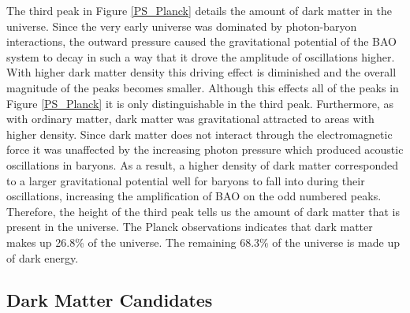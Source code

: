 \documentclass[a4paper,12pt]{article}
\begin{document}
The third peak in Figure \ref{PS_Planck} details the amount of dark matter in the universe.  Since the very early universe was dominated by photon-baryon interactions, the outward pressure caused the gravitational potential of the BAO system to decay in such a way that it drove the amplitude of oscillations higher.  With higher dark matter density this driving effect is diminished and the overall magnitude of the peaks becomes smaller.  Although this effects all of the peaks in Figure \ref{PS_Planck} it is only distinguishable in the third peak.  Furthermore, as with ordinary matter, dark matter was gravitational attracted to areas with higher density.  Since dark matter does not interact through the electromagnetic force it was unaffected by the increasing photon pressure which produced acoustic oscillations in baryons.  As a result, a higher density of dark matter corresponded to a larger gravitational potential well for baryons to fall into during their oscillations, increasing the amplification of BAO on the odd numbered peaks.  Therefore, the height of the third peak tells us the amount of dark matter that is present in the universe. \cite{Whu} The Planck observations indicates that dark matter makes up 26.8\% of the universe.  The remaining 68.3\% of the universe is made up of dark energy. \cite{Planck}



\subsection{Dark Matter Candidates}
\end{document}
